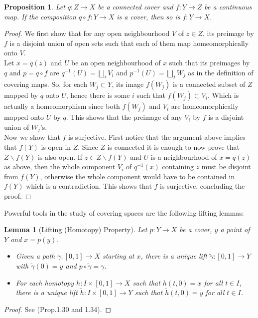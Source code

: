 \documentclass{article}
\theoremstyle{plain}
\newtheorem{proposition}[theorem]{Proposition}
\newtheorem{lemma}[theorem]{Lemma}
\theoremstyle{definition}
\begin{document}
\begin{proposition}
\label{composition_covers}
    Let $q:Z \rightarrow X$ be a connected cover and $f:Y \rightarrow Z$ be a continuous map. If the composition $q\circ f:Y \rightarrow X$ is a cover, then so is $f:Y \rightarrow X$.
\end{proposition}
\begin{proof}
    We first show that for any open neighbourhood $V$ of $z\in Z$, its preimage by $f$ is a disjoint union of open sets such that each of them map homeomorphically onto $V$.\\
    Let $x= q(z)$ and $U$ be an open neighbourhood of $x$ such that its preimages by $q$ and $p=q\circ f$ are $q^{-1}(U) = \bigsqcup_i V_i$ and $p^{-1}(U) = \bigsqcup_j W_j$ as in the definition of covering maps.
    So, for each $W_j \subset Y$, its image $f(W_j)$ is a connected subset of $Z$ mapped by $q$ onto $U$, hence there is some $i$ such that $f(W_j)\subset V_i$. 
    Which is actually a homeomorphism since both $f(W_j)$ and $V_i$ are homeomorphically mapped onto $U$ by $q$. 
    This shows that the preimage of any $V_i$ by $f$ is a disjoint union of $W_j$'s.\\
    Now we show that $f$ is surjective. First notice that the argument above implies that $f(Y)$ is open in $Z$. Since $Z$ is connected it is enough to now prove that $Z\backslash f(Y)$ is also open.
    If $z\in Z\backslash f(Y)$ and $U$ is a neighbourhood of $x=q(z)$ as above, then the whole component $V_i$ of $q^{-1}(x)$ containing $z$ must be disjoint from $f(Y)$, otherwise the whole component would have to be contained in $f(Y)$ which is a contradiction. This shows that $f$ is surjective, concluding the proof.
\end{proof}



\noindent Powerful tools in the study of covering spaces are the following lifting lemmas:

\begin{lemma}[Lifting (Homotopy) Property]
\label{unique_lift}
    Let $p:Y\rightarrow X$ be a cover, $y$ a point of $Y$ and $x=p(y)$.
    \begin{itemize}
        \item Given a path $\gamma:[0,1]\rightarrow X$ starting at $x$, there is a unique lift $\widetilde{\gamma}:[0,1]\rightarrow Y$ with $\widetilde{\gamma}(0)=y$ and $p\circ\widetilde{\gamma}=\gamma$.
        \item For each homotopy $h:I\times [0,1]\rightarrow X$ such that $h(t,0) = x$ for all $t\in I$, there is a unique lift $\widetilde{h}:I\times [0,1]\rightarrow Y$ such that $\widetilde{h}(t,0) = y$ for all $t\in I$.
    \end{itemize}
\end{lemma}
\begin{proof}
    See \cite{Hartshorne} (Prop.1.30 and 1.34).
\end{proof}
\end{document}
